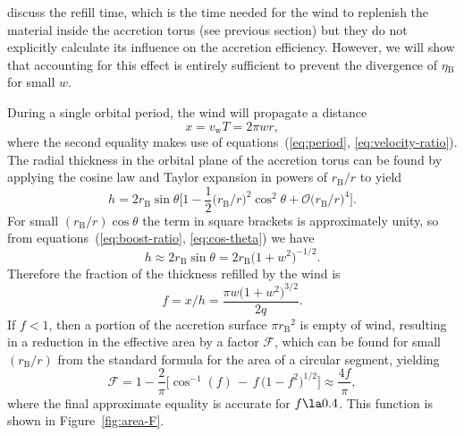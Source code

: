 \documentclass[useAMS, usenatbib, a4paper]{mnras}
\newcommand\wind{\ensuremath{_{\mathrm{w}}}}
\newcommand\bhl{\ensuremath{_{\mathrm{\scriptscriptstyle B}}}}
\begin{document}
\cite{Tejeda:2025a} discuss the refill time, which is the time
needed for the wind to replenish the material inside the accretion torus
(see previous section)
but they do not explicitly calculate its influence on the accretion efficiency.
However, we will show that accounting for this effect is entirely sufficient
to prevent the divergence of \(\eta\bhl\) for small \(w\).

During a single orbital period, the wind will propagate a distance
\begin{equation}
  \label{eq:wind-propagation}
  x = v\wind T = 2\pi w r ,
\end{equation}
where the second equality makes use of
equations~(\ref{eq:period}, \ref{eq:velocity-ratio}).
The radial thickness in the orbital plane of the accretion torus
can be found by applying the cosine law and
Taylor expansion in powers of \(r\bhl / r\) to yield
\begin{equation}
  \label{eq:torus-thickness-taylor}
  h = 2 r\bhl \sin\theta
  \biggl[
  1 - \frac12 \bigl( r\bhl / r \bigr)^2 \cos^2\theta 
  + \mathcal{O} \bigl( r\bhl / r \bigr)^4
  \biggr].
\end{equation}
For small \((r\bhl / r) \cos\theta\) the term in square brackets is approximately unity,
so from equations~(\ref{eq:boost-ratio}, \ref{eq:cos-theta}) we have
\begin{equation}
  \label{eq:torus-thickness-approx}
  h \approx 2 r\bhl \sin\theta = 2 r\bhl \bigl(1 + w^2\bigr)^{-1/2}.
\end{equation}
Therefore the fraction of the thickness refilled by the wind is
\begin{equation}
  \label{eq:refill-linear-fraction}
  f = x / h = \frac{\pi w \bigl(1 + w^2\bigr)^{3/2}}{2 q}. 
\end{equation}
If \(f < 1\), then a portion of the accretion surface \(\pi r\bhl^2\) is empty of wind,
resulting in a reduction in the effective area by a factor \(\mathcal{F}\),
which can be found for small \((r\bhl / r)\) from the standard formula
for the area of a circular segment, yielding
\begin{equation}
  \label{eq:refill-area-fraction}
  \mathcal{F} = 1 - \frac{2}{\pi} \biggl[
  \cos^{-1} (f) \, - \, f\, \bigl(1 - f^2 \bigr)^{1/2}
  \biggr]
  \approx \frac{4 f}{\pi} 
  ,
\end{equation}
where the final approximate equality is accurate for \(f \la 0.4\).
This function is shown in Figure~\ref{fig:area-F}.
\end{document}
